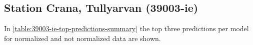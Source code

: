 \subsection{Station Crana, Tullyarvan (39003-ie)}
In \autoref{table:39003-ie-top-predictions-summary} the top three predictions per model for normalized and not normalized data are shown.


